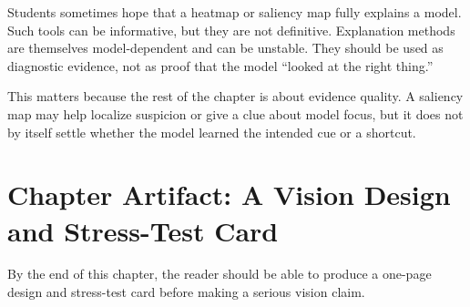 Students sometimes hope that a heatmap or saliency map fully explains a model. Such tools can be informative, but they are not definitive. Explanation methods are themselves model-dependent and can be unstable. They should be used as diagnostic evidence, not as proof that the model ``looked at the right thing.''

This matters because the rest of the chapter is about evidence quality. A saliency map may help localize suspicion or give a clue about model focus, but it does not by itself settle whether the model learned the intended cue or a shortcut.

\section{Chapter Artifact: A Vision Design and Stress-Test Card}

By the end of this chapter, the reader should be able to produce a one-page design and stress-test card before making a serious vision claim.

